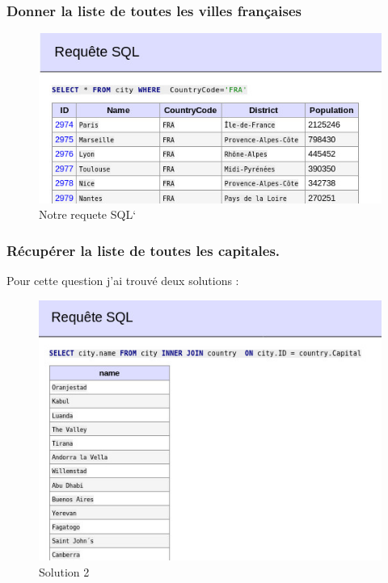 \documentclass[a4paper,10pt]{article}
\begin{document}
 \subsubsection{Donner la liste de toutes les villes françaises}
  \begin{figure}[h!]
\centering
\includegraphics[scale=0.8]{ressource/1.jpg}
\caption{Notre requete SQL`}
\label{fig:paquet}
\end{figure}
\subsubsection{Récupérer la liste de toutes les capitales.}
Pour cette question j'ai trouvé deux solutions :

  \begin{figure}[h!]
\centering
\includegraphics[scale=0.8]{ressource/2.jpg}
\caption{Solution 2}
\label{fig:paquet}
\end{figure}
\end{document}
